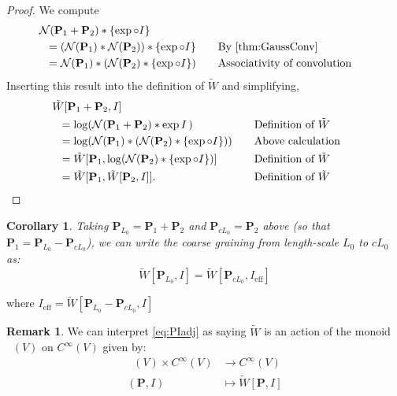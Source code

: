 \documentclass[12pt]{article}
\newcounter{counter}
\theoremstyle{definition}
\newtheorem{rmk}[counter]{Remark}
\theoremstyle{plain}
\newtheorem{cor}[counter]{Corollary}
\newcommand{\Symp}{\mathop{\mathrm{Sym}_2^+}}
\begin{document}
\begin{proof}
  We compute
  \begin{alignat}{3}
    &\hskip -6pt \mathcal{N}(\mathbf{P}_1 + \mathbf{P}_2) * \{\exp \circ I\} \\
    &= (\mathcal{N}(\mathbf{P}_1)
    * \mathcal{N}(\mathbf{P}_2)) * \{\exp \circ I\} \quad &&\text{By \autoref{thm:GaussConv}} \\
    &= \mathcal{N}(\mathbf{P}_1)
    * (\mathcal{N}(\mathbf{P}_2) * \{\exp \circ I\}) &&\text{Associativity of convolution}
  \end{alignat}
  Inserting this result into the definition of \(\tilde{W}\) and
  simplifying,
  \begin{alignat}{3}
    &\hskip -6pt \tilde{W} [\mathbf{P}_1 + \mathbf{P}_2, I] \\ 
    &= \log (\mathcal{N}(\mathbf{P}_1 + \mathbf{P}_2)* \exp{I} \, ) &&\text{Definition of }\tilde{W}\\
    &= \log (\mathcal{N}(\mathbf{P}_1)
    * (\mathcal{N}(\mathbf{P}_2) * \{\exp \circ I\})) \quad &&\text{Above calculation}\\
    &= \tilde{W} [\mathbf{P}_1,
      \log (\mathcal{N}(\mathbf{P}_2) * \{\exp \circ I\})] &&\text{Definition of }\tilde{W}\\
    &= \tilde{W} [\mathbf{P}_1, \tilde{W} [\mathbf{P}_2, I]].&&\text{Definition of }\tilde{W}
  \end{alignat}
\end{proof}


\begin{cor}
    Taking $\mathbf{P}_{L_0} = \mathbf{P}_1+\mathbf{P}_2$ and $\mathbf{P}_{cL_0}=\mathbf{P}_2$ above (so that $\mathbf{P}_1 = \mathbf{P}_{L_0}-\mathbf{P}_{cL_0}$), 
    we can write the coarse graining from length-scale $L_0$ to $cL_0$ as:
    \begin{equation} \label{eq:coarseGrain}
        \tilde{W} [\mathbf{P}_{L_0}, I] = \tilde{W} [\mathbf{P}_{cL_0}, I_{\mathrm{eff}}]
    \end{equation}
\end{cor}

where \(I_{\text{eff}} = \tilde{W} [\mathbf{P}_{L_0} - \mathbf{P}_{cL_0}, I]\)\\

\begin{rmk}\label{rmk:CgAction}
     We can interpret \autoref{eq:PIadj} as saying $\tilde{W}$ is an action of the monoid $\Symp (V)$ on $C^\infty(V)$ given by:
     \begin{align}
         \Symp (V) \times C^\infty(V) &\to C^\infty(V)\\
         (\mathbf{P},I) &\mapsto \tilde{W}[\mathbf{P},I]
     \end{align}
\end{rmk}
\end{document}
